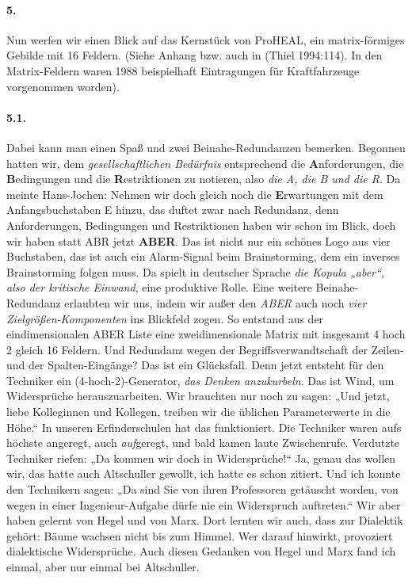 \documentclass[12pt,a4paper]{article}
\begin{document}
\paragraph{5.}
Nun werfen wir einen Blick auf das Kernstück von ProHEAL, ein matrix-förmiges
Gebilde mit 16 Feldern. (Siehe Anhang bzw. auch in (Thiel 1994:114). In den
Matrix-Feldern waren 1988 beispielhaft Eintragungen für Kraftfahrzeuge
vorgenommen worden).

\paragraph{5.1.}
Dabei kann man einen Spaß und zwei Beinahe-Redundanzen bemerken. Begonnen
hatten wir, dem \emph{gesellschaftlichen Bedürfnis} entsprechend die
\textbf{A}nforderungen, die \textbf{B}edingungen und die
\textbf{R}estriktionen zu notieren, also \emph{die A, die B und die R}. Da
meinte Hans-Jochen: Nehmen wir doch gleich noch die \textbf{E}rwartungen mit
dem Anfangsbuchstaben E hinzu, das duftet zwar nach Redundanz, denn
Anforderungen, Bedingungen und Restriktionen haben wir schon im Blick, doch
wir haben statt ABR jetzt \textbf{ABER}. Das ist nicht nur ein schönes Logo
aus vier Buchstaben, das ist auch ein Alarm-Signal beim Brainstorming, dem ein
inverses Brainstorming folgen muss. Da spielt in deutscher Sprache \emph{die
  Kopula „aber“, also der kritische Einwand}, eine produktive Rolle. Eine
weitere Beinahe-Redundanz erlaubten wir uns, indem wir außer den \emph{ABER}
auch noch \emph{vier Zielgrößen-Komponenten} ins Blickfeld zogen. So entstand
aus der eindimensionalen ABER Liste eine zweidimensionale Matrix mit insgesamt
4 hoch 2 gleich 16 Feldern. Und Re\-dundanz wegen der Begriffsverwandtschaft
der Zeilen- und der Spalten-Eingänge? Das ist ein Glücksfall. Denn jetzt
entsteht für den Techniker ein (4-hoch-2)-Generator, \emph{das Denken
  anzukurbeln}. Das ist Wind, um Widersprüche herauszuarbeiten. Wir brauchten
nur noch zu sagen: „Und jetzt, liebe Kolleginnen und Kollegen, treiben wir die
üblichen Parameterwerte in die Höhe.“ In unseren Erfinderschulen hat das
funktioniert. Die Techniker waren aufs höchste angeregt, auch
\emph{auf}geregt, und bald kamen laute Zwischenrufe. Verdutzte Techniker
riefen: „Da kommen wir doch in Widersprüche!“ Ja, genau das wollen wir, das
hatte auch Altschuller gewollt, ich hatte es schon zitiert. Und ich konnte den
Technikern sagen: „Da sind Sie von ihren Professoren getäuscht worden, von
wegen in einer Ingenieur-Aufgabe dürfe nie ein Widerspruch auftreten.“ Wir
aber haben gelernt von Hegel und von Marx.  Dort lernten wir auch, dass zur
Dialektik gehört: Bäume wachsen nicht bis zum Himmel. Wer darauf hinwirkt,
provoziert dialektische Widersprüche.  Auch diesen Gedanken von Hegel und Marx
fand ich einmal, aber nur einmal bei Altschuller.
\end{document}

